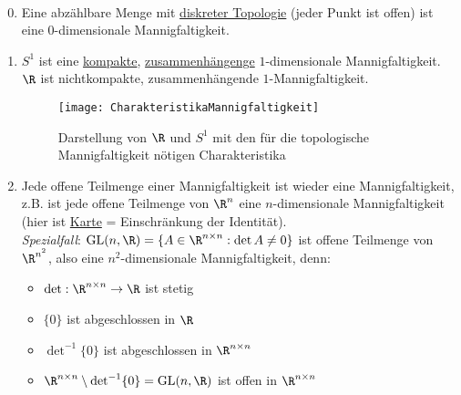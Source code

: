 \begin{example}
  \
  \begin{enumerate}
    \setcounter{enumi}{-1}

    \item Eine abzählbare Menge mit \hyperref[bsp:diskreteTopologie]{diskreter Topologie} (jeder Punkt ist offen) ist eine \( 0 \)-dimensionale Mannigfaltigkeit.

    \item \( S^1 \) ist eine \hyperref[def:kompakt]{kompakte}, \hyperref[def:zusammenhaengend]{zusammenhängenge} \( 1 \)-dimensionale Mannigfaltigkeit. \\
      \( \R \) ist nichtkompakte, zusammenhängende \( 1 \)-Mannigfaltigkeit.

    \begin{figure}[H]
      \texttt{[image: CharakteristikaMannigfaltigkeit]}
      \captionsetup{width=.5\textwidth}
      \caption{Darstellung von \( \R \) und \( S^1 \) mit den für die topologische Mannigfaltigkeit nötigen Charakteristika}
    \end{figure}

    \item Jede offene Teilmenge einer Mannigfaltigkeit ist wieder eine Mannigfaltigkeit, z.B. ist jede offene Teilmenge von \( \R^n \) eine \( n \)-dimensionale Mannigfaltigkeit (hier ist \hyperref[def:karte]{Karte} = Einschränkung der Identität). \\
    \emph{Spezialfall}: \( \text{GL}(n,\R) = \{ A \in \R^{n \times n} : \det A \neq 0 \} \) ist offene Teilmenge von \( \R^{n^2} \), also eine \( n^2 \)-dimensionale Mannigfaltigkeit, denn:
    \begin{itemize}
      \item \( \det : \R^{n \times n} \to \R \) ist stetig
      \item \( \{ 0 \} \) ist abgeschlossen in \( \R \)
      \item \( \det^{-1} \{ 0 \} \) ist abgeschlossen in \( \R^{n \times n} \)
      \item \( \R^{n \times n} \setminus \det^{-1} \{ 0 \} = \text{GL}(n,\R ) \) ist offen in \( \R^{n \times n} \)
    \end{itemize}


\end{enumerate}
\end{example}
